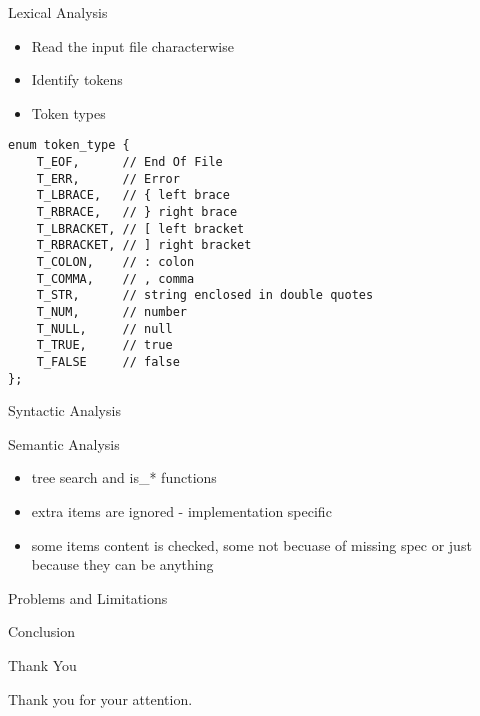 \documentclass{beamer}
\begin{document}
\begin{frame}[fragile]{Lexical Analysis}

\begin{itemize}
    \item Read the input file characterwise
    \pause \item Identify tokens
    \pause \item Token types
\end{itemize}

\begin{Verbatim}[fontsize=\small]
enum token_type {
    T_EOF,      // End Of File
    T_ERR,      // Error
    T_LBRACE,   // { left brace
    T_RBRACE,   // } right brace
    T_LBRACKET, // [ left bracket
    T_RBRACKET, // ] right bracket
    T_COLON,    // : colon
    T_COMMA,    // , comma
    T_STR,      // string enclosed in double quotes
    T_NUM,      // number
    T_NULL,     // null
    T_TRUE,     // true
    T_FALSE     // false
};
\end{Verbatim}
\end{frame}

\begin{frame}{Syntactic Analysis}

\end{frame}

\begin{frame}{Semantic Analysis}
\begin{itemize}
	\item tree search and is\_* functions
	\item extra items are ignored - implementation specific
	\item some items content is checked, some not becuase of missing spec or just because they can be anything
\end{itemize}
\end{frame}

\begin{frame}{Problems and Limitations}

\end{frame}

\begin{frame}{Conclusion}

\end{frame}

\begin{frame}{Thank You}
    \Huge{\centerline{Thank you for your attention.}}
\end{frame}

\end{document}
